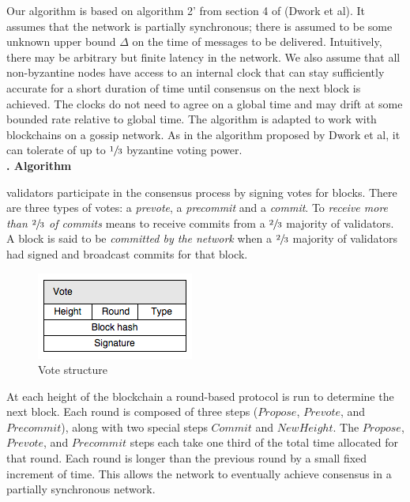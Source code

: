 \documentclass[letter,11pt]{article}
\newcounter{myseccnt}     %
\newcounter{mysubseccnt}  %
\newcommand{\mysubsection}[1]
{\vspace{0mm}\noindent\fontsize{13pt}{15pt}\color{black!50}
\stepcounter{mysubseccnt}\textbf{\arabic{myseccnt}.\arabic{mysubseccnt} #1}\normalsize\vspace{5mm}\color{black}}
\begin{document}
Our algorithm is based on algorithm 2’ from section 4 of \cite{article:dwork} (Dwork et al).  It assumes that the network is partially synchronous; there is assumed to be some unknown upper bound $\Delta$ on the time of messages to be delivered.  Intuitively, there may be arbitrary but finite latency in the network.  We also assume that all non-byzantine nodes have access to an internal clock that can stay sufficiently accurate for a short duration of time until consensus on the next block is achieved.  The clocks do not need to agree on a global time and may drift at some bounded rate relative to global time.  The algorithm is adapted to work with blockchains on a gossip network.  As in the algorithm proposed by Dwork et al, it can tolerate of up to $\sfrac{1}{3}$  byzantine voting power.\\



\mysubsection{Algorithm}

validators participate in the consensus process by signing votes for blocks.  There are three types of votes: a \textit{prevote}, a \textit{precommit} and a \textit{commit}.  To \textit{receive more than $\sfrac{2}{3}$ of commits} means to receive commits from a $\sfrac{2}{3}$ majority of validators.  A block is said to be \textit{committed by the network} when a $\sfrac{2}{3}$ majority of validators had signed and broadcast commits for that block.

\begin{figure}[H]
 \centering
 \includegraphics[scale=0.5]{figures/vote.png}
 \caption{Vote structure}
\end{figure}

At each height of the blockchain a round-based protocol is run to determine the next block.  Each round is composed of three steps ($Propose$, $Prevote$, and $Precommit$), along with two special steps $Commit$ and $NewHeight$.  The $Propose$, $Prevote$, and $Precommit$ steps each take one third of the total time allocated for that round.  Each round is longer than the previous round by a small fixed increment of time.  This allows the network to eventually achieve consensus in a partially synchronous network.
\end{document}
